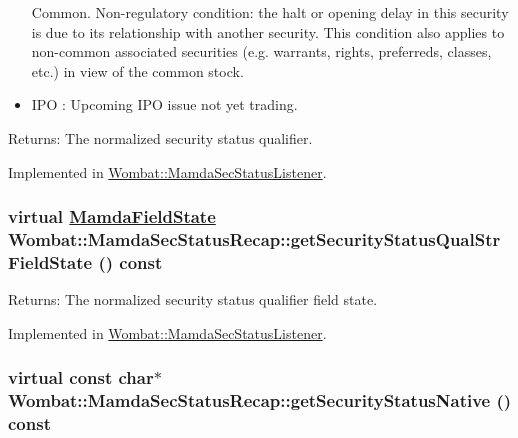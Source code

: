 \begin{itemize}
Common. Non-regulatory condition: the halt or opening delay in this security is due to its relationship with another security. This condition also applies to non-common associated securities (e.g. warrants, rights, preferreds, classes, etc.) in view of the common stock. \item IPO : Upcoming IPO issue not yet trading. \end{itemize}


\begin{Desc}
\item[Returns:]The normalized security status qualifier. \end{Desc}


Implemented in \hyperlink{classWombat_1_1MamdaSecStatusListener_4e5aae3d78147807618e44d3bfe96275}{Wombat::Mamda\-Sec\-Status\-Listener}.\hypertarget{classWombat_1_1MamdaSecStatusRecap_65f3b09b216df6fbe543f00934b8f93e}{
\subsubsection[getSecurityStatusQualStrFieldState]{\setlength{\rightskip}{0pt plus 5cm}virtual \hyperlink{namespaceWombat_93aac974f2ab713554fd12a1fa3b7d2a}{Mamda\-Field\-State} Wombat::Mamda\-Sec\-Status\-Recap::get\-Security\-Status\-Qual\-Str\-Field\-State () const}}
\label{classWombat_1_1MamdaSecStatusRecap_65f3b09b216df6fbe543f00934b8f93e}


\begin{Desc}
\item[Returns:]The normalized security status qualifier field state. \end{Desc}


Implemented in \hyperlink{classWombat_1_1MamdaSecStatusListener_31cde3bb8da5542a23a39227caa7106a}{Wombat::Mamda\-Sec\-Status\-Listener}.\hypertarget{classWombat_1_1MamdaSecStatusRecap_328499a1789c66b0d775f207480ef314}{
\subsubsection[getSecurityStatusNative]{\setlength{\rightskip}{0pt plus 5cm}virtual const char$\ast$ Wombat::Mamda\-Sec\-Status\-Recap::get\-Security\-Status\-Native () const}}
\label{classWombat_1_1MamdaSecStatusRecap_328499a1789c66b0d775f207480ef314}


